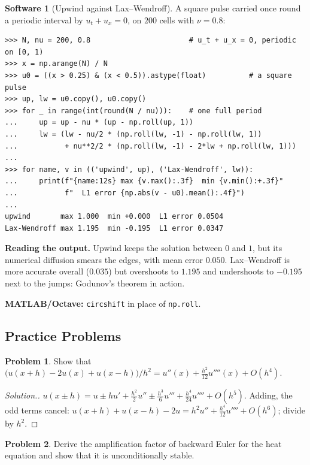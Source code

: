 \documentclass[11pt,a4paper]{article}
\numberwithin{equation}{section}
\theoremstyle{definition}
\newtheorem{software}[thm]{Software}
\newtheorem{problemx}{Problem}[subsection]
\newenvironment{problem}{\begin{problemx}}{\end{problemx}}
\newenvironment{solution}
  {\renewcommand{\qedsymbol}{}\begin{proof}[\textit{Solution}.]}
  {\end{proof}}
\begin{document}
\begin{software}[Upwind against Lax--Wendroff]
\label{sw:advection}
A square pulse carried once round a periodic interval by $u_t + u_x = 0$, on $200$ cells with $\nu = 0.8$:
{\small\begin{verbatim}
>>> N, nu = 200, 0.8                       # u_t + u_x = 0, periodic on [0, 1)
>>> x = np.arange(N) / N
>>> u0 = ((x > 0.25) & (x < 0.5)).astype(float)          # a square pulse
>>> up, lw = u0.copy(), u0.copy()
>>> for _ in range(int(round(N / nu))):    # one full period
...     up = up - nu * (up - np.roll(up, 1))
...     lw = (lw - nu/2 * (np.roll(lw, -1) - np.roll(lw, 1))
...           + nu**2/2 * (np.roll(lw, -1) - 2*lw + np.roll(lw, 1)))
...
>>> for name, v in (('upwind', up), ('Lax-Wendroff', lw)):
...     print(f"{name:12s} max {v.max():.3f}  min {v.min():+.3f}"
...           f"  L1 error {np.abs(v - u0).mean():.4f}")
...
upwind       max 1.000  min +0.000  L1 error 0.0504
Lax-Wendroff max 1.195  min -0.195  L1 error 0.0347
\end{verbatim}}
\textbf{Reading the output.} Upwind keeps the solution between $0$ and $1$, but its numerical diffusion smears the edges, with mean error $0.050$. Lax--Wendroff is more accurate overall ($0.035$) but overshoots to $1.195$ and undershoots to $-0.195$ next to the jumps: Godunov's theorem in action.

\textbf{MATLAB/Octave:} \texttt{circshift} in place of \texttt{np.roll}.
\end{software}

\subsection{Practice Problems}

\begin{problem}
Show that $\bigl(u(x + h) - 2u(x) + u(x - h)\bigr)/h^2 = u''(x) + \frac{h^2}{12}u''''(x) + O(h^4)$.
\end{problem}

\begin{solution}
$u(x \pm h) = u \pm hu' + \frac{h^2}2u'' \pm \frac{h^3}6u''' + \frac{h^4}{24}u'''' + O(h^5)$. Adding, the odd terms cancel: $u(x + h) + u(x - h) - 2u = h^2u'' + \frac{h^4}{12}u'''' + O(h^6)$; divide by $h^2$.
\end{solution}

\begin{problem}
Derive the amplification factor of backward Euler for the heat equation and show that it is unconditionally stable.
\end{problem}
\end{document}
